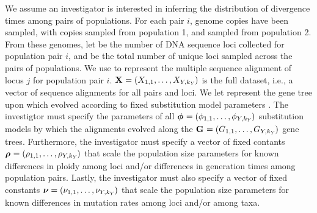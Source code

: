 \documentclass[letterpaper,12pt]{article}
\begin{document}
\begin{linenumbers}
We assume an investigator is interested in inferring the distribution
of divergence times among \npairs{} pairs of populations.
For each pair $i$,  genome copies have been sampled, with
 copies sampled from population 1, and 
sampled from population 2.
From these genomes, let  be the number of DNA sequence loci collected
for population pair $i$, and \nlociTotal be the total number of unique loci
sampled across the \npairs{} pairs of populations.
We use  to represent the multiple sequence alignment of
locus $j$ for population pair $i$.
$\alignmentVector = (\alignment{1}{1}, \ldots,
    \alignment{\npairs{}}{\nloci{\npairs{}}})$
is the full dataset,
i.e., a vector of sequence alignments for all pairs and loci.
We let  represent the gene tree upon which 
evolved according to fixed \hky substitution model parameters .
The investigtor must specify the parameters of all
$\hkyModelVector = (\hkyModel{1}{1}, \ldots,
\hkyModel{\npairs{}}{\nloci{\npairs{}}})$
substitution models by which the alignments evolved along the
$\geneTreeVector = (\geneTree{1}{1}, \ldots,
\geneTree{\npairs{}}{\nloci{\npairs{}}})$
gene trees.
Furthermore, the investigator must specify a vector of fixed contants
$\ploidyScalarVector = (\ploidyScalar{1}{1}, \ldots,
\ploidyScalar{\npairs{}}{\nloci{\npairs{}}})$
that scale the population size parameters for known differences in ploidy among
loci and/or differences in generation times among population pairs.
Lastly, the investigator must also specify a vector of fixed constants
$\mutationRateScalarConstantVector = (\mutationRateScalarConstant{1}{1},
\ldots, \mutationRateScalarConstant{\npairs{}}{\nloci{\npairs{}}})$
that scale the population size parameters for known differences in
mutation rates among loci and/or among taxa.


\end{linenumbers}
\end{document}
